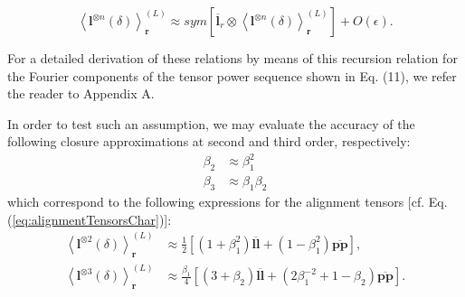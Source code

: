 \begin{equation}\left\langle \boldsymbol{l}^{\otimes n}(\delta) \right\rangle_{\boldsymbol{r}}^{(L)} \approx sym\left\lbrack {\overline{\boldsymbol{l}}}_{r} \otimes \left\langle \boldsymbol{l}^{\otimes n}(\delta) \right\rangle_{\boldsymbol{r}}^{(L)} \right\rbrack + O(\epsilon).\end{equation}

For a detailed derivation of these relations by means of this recursion
relation for the Fourier components of the tensor power sequence shown
in Eq. (11), we refer the reader to Appendix A.

In order to test such an assumption, we may evaluate the accuracy of the
following closure approximations at second and third order,
respectively:
\begin{align}
\beta_{2} &\approx \beta_{1}^{2}\label{eq:LB1}\\
\beta_{3} &\approx \beta_1\beta_2\label{eq:LB2}
\end{align}
which correspond to the following expressions for the alignment tensors [cf. Eq. (\ref{eq:alignmentTensorsChar})]:
\begin{subequations}
\begin{align}
    \left\langle \boldsymbol{l}^{\otimes 2}(\delta) \right\rangle_{\boldsymbol{r}}^{(L)}&\approx\frac{1}{2}\left\lbrack \left( 1 + \beta_{1}^{2} \right)\overline{\boldsymbol{ll}} + \left( 1 - \beta_{1}^{2} \right)\overline{\boldsymbol{pp}} \right\rbrack,\\
    \left\langle \boldsymbol{l}^{\otimes 3}(\delta) \right\rangle_{\boldsymbol{r}}^{(L)}&\approx\frac{\beta_{1}}{4}\left\lbrack \left( 3 + \beta_{2} \right)\overline{\boldsymbol{ll}} + \left( 2\beta_{1}^{- 2} + 1 - \beta_{2} \right)\overline{\boldsymbol{pp}} \right\rbrack.
\end{align}
\end{subequations}

